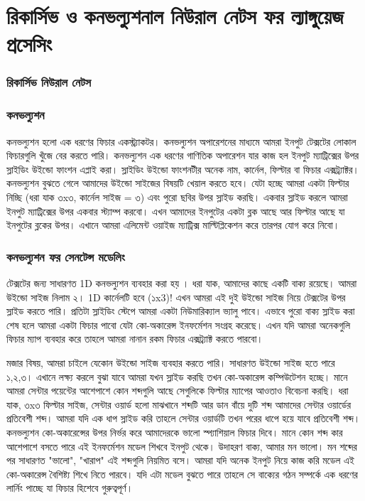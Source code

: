 \documentclass{book}
\begin{document}
\chapter{রিকার্সিভ ও কনভল্যুশনাল নিউরাল নেটস ফর ল্যাঙ্গুয়েজ প্রসেসিং}
\subsection{রিকার্সিভ নিউরাল নেটস}
\subsection{কনভল্যুশন}
কনভল্যুশন হলো এক ধরণের ফিচার একস্ট্র্যাকটর। কনভল্যুশন অপারেশনের মাধ্যমে আমরা ইনপুট টেক্সটের লোকাল ফিচারগুলি খুঁজে বের করতে পারি। 
কনভল্যুশন এক ধরণের গাণিতিক অপারেশন যার কাজ হল ইনপুট ম্যাট্রিক্সের উপর স্লাইডিং উইন্ডো ফাংশন এপ্লাই করা।
স্লাইডিং উইন্ডো ফাংশনটীর অনেক নাম, কার্নেল, ফিল্টার বা ফিচার এক্সট্র্যাক্টর। কনভল্যুশন বুঝতে গেলে আমাদের উইন্ডো সাইজের বিষয়টি খেয়াল করতে হবে। 
যেটা হচ্ছে আমরা একটা ফিল্টার নিচ্ছি (ধরা যাক ৩x৩, কার্নেল সাইজ = ৩) এবং পুরো ছবির উপর স্লাইড করছি।
একবার স্লাইড করলে আমরা ইনপুট ম্যাট্রিক্সের উপর একবার স্ট্যাম্প করবো। এখন আমাদের ইনপুটের একটা ব্লক আছে আর ফিল্টার আছে যা ইনপুটের ব্লকের উপর। 
এখানে আমরা এলিমেন্ট ওয়াইজ ম্যাট্রিক্স মাল্টিপ্লিকেশন করে তারপর যোগ করে নিবো।



\subsection{কনভল্যুশন ফর সেনটেন্স মডেলিং}
টেক্সটের জন্য সাধারণত 1D কনভল্যুশন ব্যবহার করা হয় \cite{kalchbrenner-etal-2014-convolutional}।  ধরা যাক, আমাদের কাছে একটি বাক্য রয়েছে।  আমরা উইন্ডো সাইজ নিলাম ২। 1D কার্নেলটি হবে (১x3)!  
এখন আমরা এই দুই উইন্ডো সাইজ নিয়ে টেক্সটের উপর স্লাইড করতে পারি। প্রতিটা স্লাইডিং স্টেপে আমরা একটা নিউমারিক্যাল ভ্যালু পাবে। 
এভাবে পুরো বাক্য স্লাইড করা শেষ হলে আমরা একটা ফিচার পাবো যেটা কো-অকারেন্স ইনফর্মেশন সংগ্রহ করেছে। 
এখন যদি আমরা অনেকগুলি ফিচার ম্যাপ ব্যবহার করে তাহলে আমরা নানান রকম ফিচার এক্সট্র্যাক্ট করতে পারবো। 

মজার বিষয়,  আমরা চাইলে যেকোন উইন্ডো সাইজ ব্যবহার করতে পারি। সাধারণত উইন্ডো সাইজ হতে পারে ১,২,৩। 
এখানে লক্ষ্য করলে বুঝা যাবে আমরা যখন স্লাইড করছি তখন কো-অকারেন্স কম্পিউটেশন হচ্ছে। মানে আমরা সেন্টার পয়েন্টের আশেপাশে কোন শব্দগুলি আছে সেগুলিকে ফিল্টার ম্যাপের আওতাও বিবেচনা করছি।
ধরা যাক, ৩x৩ ফিল্টার সাইজ, সেন্টার ওয়ার্ড হলো মাঝখানে শব্দটি আর ডান বাঁয়ে দুটি শব্দ আমাদের সেন্টার ওয়ার্ডের প্রতিবেশী শব্দ। আমরা যদি এক ধাপ স্লাইড করি তাহলে সেন্টার ওয়ার্ডটি 
তখন পরের ধাপে হয়ে যাবে প্রতিবেশী শব্দ। কনভল্যুশন কো-অকারেন্সের উপর নির্ভর করে আমাদেরকে ভালো স্প্যাশিয়াল ফিচার দিবে। মানে কোন শব্দ কার আশেপাশে বসতে পারে এই ইনফর্মেশন 
মডেল শিখবে ইনপুট থেকে। উদাহরণ বাক্য, আমার মন ভালো। মন শব্দের পর সাধারণত "ভালো",  "খারাপ" এই শব্দগুলি নিয়মিত বসে। আমরা যদি অনেক ইনপুট নিয়ে কাজ করি মডেল এই কো-অকারেন্স 
বৈশিষ্ট্য শিখে নিতে পারবে। যদি এটা মডেল বুঝতে পারে তাহলে সে বাক্যের গঠন সম্পর্কে এক ধরণের লার্নিং পাচ্ছে যা ফিচার হিশেবে গুরুত্বপূর্ণ।
\end{document}
